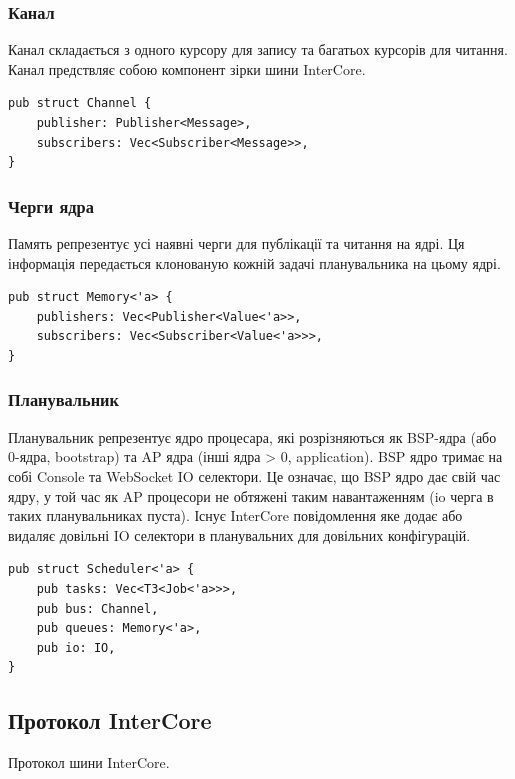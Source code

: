 \begin{definition}
\begin{definition}
\begin{definition}
\begin{definition}
\paragraph{}
\subsubsection{Канал}
Канал складається з одного курсору для запису та багатьох курсорів для читання.
Канал предствляє собою компонент зірки шини InterCore.
\begin{lstlisting}
pub struct Channel {
    publisher: Publisher<Message>,
    subscribers: Vec<Subscriber<Message>>,
}
\end{lstlisting}

\subsubsection{Черги ядра}
Память репрезентує усі наявні черги для публікації та читання на ядрі.
Ця інформація передається клонованую кожній задачі планувальника на цьому ядрі.
\begin{lstlisting}
pub struct Memory<'a> {
    publishers: Vec<Publisher<Value<'a>>,
    subscribers: Vec<Subscriber<Value<'a>>>,
}
\end{lstlisting}

\subsubsection{Планувальник}
Планувальник репрезентує ядро процесара,
які розрізняються як BSP-ядра (або 0-ядра, bootstrap)
та AP ядра (інші ядра > 0, application). BSP ядро
тримає на собі Console та WebSocket IO селектори.
Це означає, що BSP ядро дає свій час ядру, у той час як AP процесори не обтяжені
таким навантаженням (io черга в таких планувальниках пуста).
Існує InterCore повідомлення яке додає або видаляє довільні IO селектори
в планувальних для довільних конфігурацій.

\begin{lstlisting}
pub struct Scheduler<'a> {
    pub tasks: Vec<T3<Job<'a>>>,
    pub bus: Channel,
    pub queues: Memory<'a>,
    pub io: IO,
}
\end{lstlisting}

\subsection{Протокол InterCore}

Протокол шини InterCore.


\end{definition}
\end{definition}
\end{definition}
\end{definition}
